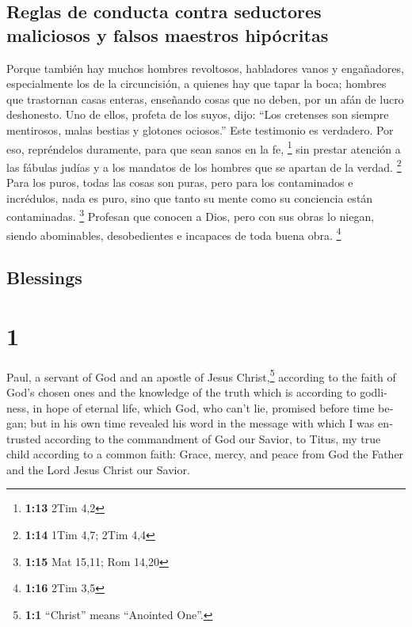 \begin{paracol}{2}
\hypertarget{reglas-de-conducta-contra-seductores-maliciosos-y-falsos-maestros-hipuxf3critas}{%
\subsection{Reglas de conducta contra seductores maliciosos y falsos
maestros
hipócritas}\label{reglas-de-conducta-contra-seductores-maliciosos-y-falsos-maestros-hipuxf3critas}}

 Porque también hay muchos hombres revoltosos, habladores
vanos y engañadores, especialmente los de la circuncisión,
 a quienes hay que tapar la boca; hombres que trastornan
casas enteras, enseñando cosas que no deben, por un afán de lucro
deshonesto.  Uno de ellos, profeta de los suyos, dijo:
``Los cretenses son siempre mentirosos, malas bestias y glotones
ociosos.''  Este testimonio es verdadero. Por eso,
repréndelos duramente, para que sean sanos en la fe, \footnote{\textbf{1:13}
  2Tim 4,2}  sin prestar atención a las fábulas judías y
a los mandatos de los hombres que se apartan de la verdad. \footnote{\textbf{1:14}
  1Tim 4,7; 2Tim 4,4}  Para los puros, todas las cosas
son puras, pero para los contaminados e incrédulos, nada es puro, sino
que tanto su mente como su conciencia están contaminadas. \footnote{\textbf{1:15}
  Mat 15,11; Rom 14,20}  Profesan que conocen a Dios,
pero con sus obras lo niegan, siendo abominables, desobedientes e
incapaces de toda buena obra. \footnote{\textbf{1:16} 2Tim 3,5}

\switchcolumn
\begin{otherlanguage}{english}

\hypertarget{blessings}{%
\subsection{Blessings}\label{blessings}}

\hypertarget{section-1}{%
\section{1}\label{section-1}}

 Paul, a servant of God and an apostle of Jesus
Christ,\footnote{\textbf{1:1} ``Christ'' means ``Anointed One''.}
according to the faith of God's chosen ones and the knowledge of the
truth which is according to godliness,  in hope of eternal
life, which God, who can't lie, promised before time began;
 but in his own time revealed his word in the message with
which I was entrusted according to the commandment of God our Savior,
 to Titus, my true child according to a common faith:
Grace, mercy, and peace from God the Father and the Lord Jesus Christ
our Savior.


\end{otherlanguage}
\end{paracol}
